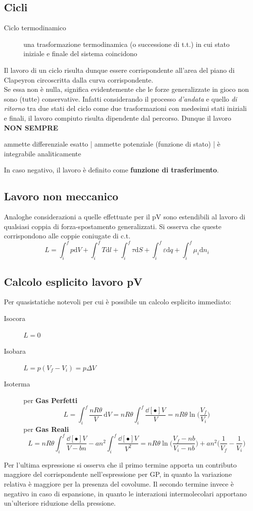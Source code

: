 \documentclass[10pt, oneside]{book}
\newcommand{\integral}[4]{\int_{#1}^{#2} #3 \, \mathrm{d}#4}
\begin{document}
\subsection{Cicli}
\begin{description}
\item[Ciclo termodinamico] una trasformazione termodinamica (o successione di t.t.) in cui stato iniziale e finale del sistema coincidono
\end{description}
Il lavoro di un ciclo risulta dunque essere corrispondente all'area del piano di Clapeyron circoscritta dalla curva corrispondente.\\
Se essa non è nulla, significa evidentemente che le forze generalizzate in gioco non sono (tutte) conservative. Infatti considerando il processo \textit{d'andata} e quello \textit{di ritorno} tra due stati del ciclo come due trasformazioni con medesimi stati iniziali e finali, il lavoro compiuto risulta dipendente dal percorso. Dunque il lavoro \textbf{NON SEMPRE}
\begin{center}ammette differenziale esatto | ammette potenziale (funzione di stato) | è integrabile analiticamente \end{center}
In caso negativo, il lavoro è definito come \textbf{funzione di trasferimento}.

\subsection{Lavoro non meccanico}
Analoghe considerazioni a quelle effettuate per il pV sono estendibili al lavoro di qualsiasi coppia di forza-spostamento generalizzati. Si osserva che queste corrispondono alle coppie coniugate di c.t.
\[ L = \int_{i}^{f}p\mathrm{d}V + \int_{i}^{f}T \mathrm{d}l + \int_{i}^{f}\tau \mathrm{d}S + \int_{i}^{f}\varepsilon \mathrm{d}q + \int_{i}^{f}\mu_i \mathrm{d}n_i\]

\subsection{Calcolo esplicito lavoro pV}
Per quasistatiche notevoli per cui è possibile un calcolo esplicito immediato:
\begin{description}
\item[Isocora] $\displaystyle L = 0$
\item[Isobara] $\displaystyle L = p(V_f - V_i) = p \Delta V$
\item[Isoterma] per \textbf{Gas Perfetti} \[ L = \integral{i}{f}{\frac{nR \theta}{V}}{V} = nR \theta \int_i^f \frac{\dd[•]{V}}{V} = nR \theta \ln \big(\frac{V_f}{V_i}\big)\] 
per \textbf{Gas Reali} \[ L = n R \theta \int_i^f \frac{\dd[•]{V}}{V - bn} - a n^2 \int_i^f \frac{\dd[•]{V}}{V^2} =  nR\theta \ln \bigg(\frac{V_f - nb}{V_i - nb}\bigg) + an^2 \big(\frac{1}{V_f} - \frac{1}{V_i}\big)\]
\end{description}
Per l'ultima espressione si osserva che il primo termine apporta un contributo maggiore del corrispondente nell'espressione per GP, in quanto la variazione relativa è maggiore per la presenza del covolume. Il secondo termine invece è negativo in caso di espansione, in quanto le interazioni intermolecolari apportano un'ulteriore riduzione della pressione.
\end{document}
